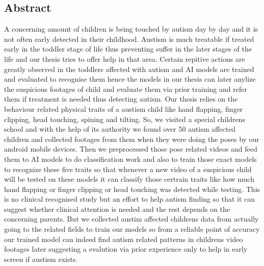 \begin{center}
    \section*{Abstract}
\end{center}
A concerning amount of children is being touched by autism day by day and it is not often early detected in their childhood. Austism is much treatable if treated early in the toddler stage of life thus preventing suffer in the later stages of the life and our thesis tries to offer help in that area. Certain repitive actions are greatly observed in the toddlers affected with autism and AI models are trained and evaluated to recognise them hence the models in our thesis can later anylize the suspicious footages of child and evaluate them via prior training and refer them if treatment is needed thus detecting autism. Our thesis relies on the behaviour related physical traits of a austism child like hand flapping, finger clipping, head touching, spining and tilting. So, we visited a special childrens school and with the help of its authority we found over 50 autism affected children and collected footages from them when they were doing the poses by our android mobile devices. Then we preprocessed those pose related videos and feed them to AI models to do classification work and also to train those exact models to recognize these five traits so that whenever a new video of a suspicious child will be tested on these models it can classify those certrain traits like how much hand flapping or finger clipping or head touching was detected while testing. This is no clinical recognised study but an effort to help autism finding so that it can suggest whether clinical attention is needed and the rest depends on the concerning parents. But we collected austim affected childrens data from actually going to the related fields to train our models so from a reliable point of accuracy our trained model can indeed find autism related patterns in childrens video footages later suggesting a evalution via prior experience only to help in early screen if austism exists.